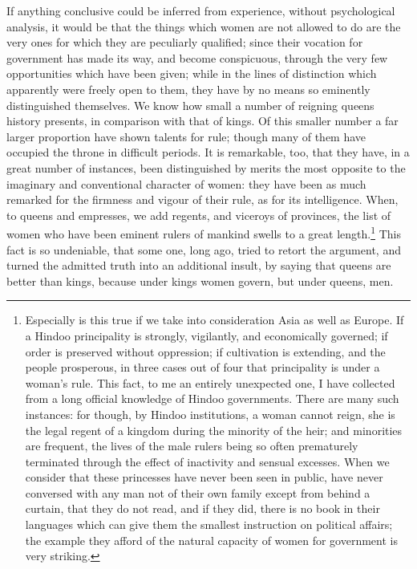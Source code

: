 \documentclass[12pt]{report}
\begin{document}
If anything conclusive could be inferred from experience, without psychological analysis, it would be that the things which women are not allowed to do are the very ones for which they are peculiarly qualified; since their vocation for government has made its way, and become conspicuous, through the very few opportunities which have been given; while in the lines of distinction which apparently were freely open to them, they have by no means so eminently distinguished themselves. We know how small a number of reigning queens history presents, in comparison with that of kings. Of this smaller number a far larger proportion have shown talents for rule; though many of them have occupied the throne in difficult periods. It is remarkable, too, that they have, in a great number of instances, been distinguished by merits the most opposite to the imaginary and conventional character of women: they have been as much remarked for the firmness and vigour of their rule, as for its intelligence. When, to queens and empresses, we add regents, and viceroys of provinces, the list of women who have been eminent rulers of mankind swells to a great length.\footnote{Especially is this true if we take into consideration Asia as well as Europe. If a Hindoo principality is strongly, vigilantly, and economically governed; if order is preserved without oppression; if cultivation is extending, and the people prosperous, in three cases out of four that principality is under a woman's rule. This fact, to me an entirely unexpected one, I have collected from a long official knowledge of Hindoo governments. There are many such instances: for though, by Hindoo institutions, a woman cannot reign, she is the legal regent of a kingdom during the minority of the heir; and minorities are frequent, the lives of the male rulers being so often prematurely terminated through the effect of inactivity and sensual excesses. When we consider that these princesses have never been seen in public, have never conversed with any man not of their own family except from behind a curtain, that they do not read, and if they did, there is no book in their languages which can give them the smallest instruction on political affairs; the example they afford of the natural capacity of women for government is very striking.} This fact is so undeniable, that some one, long ago, tried to retort the argument, and turned the admitted truth into an additional insult, by saying that queens are better than kings, because under kings women govern, but under queens, men.
\end{document}
